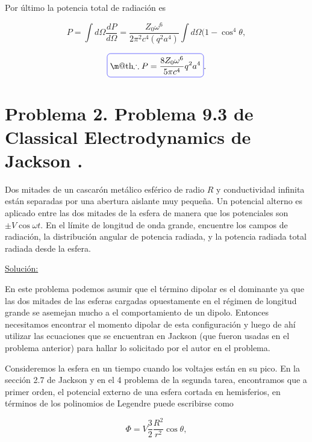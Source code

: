 \documentclass[a4paper,11pt]{article}
\makeatletter
\numberwithin{equation}{section}
\newcommand*{\boxcolor}{blue}
\renewcommand{\boxed}[1]{\textcolor{\boxcolor}{%
\tikz[baseline={([yshift=-1ex]current bounding box.center)}] \node [rectangle, minimum width=1ex,rounded corners,draw] {\normalcolor\m@th$\displaystyle#1$};}}
\makeatother
\begin{document}
Por último la potencia total de radiación es 

\begin{equation}
 P = \int d\Omega \frac{dP}{d\Omega} = \frac{Z_0\omega^6}{2\pi^2c^4(q^2a^4)} 
 \int d\Omega (1 - \cos^4{\theta},
\end{equation}

\begin{equation}
 \boxed{\therefore P = \frac{8Z_0\omega^6}{5\pi c^4}q^2a^4}.
\end{equation}

\newpage

\section{Problema 2. Problema 9.3 de Classical Electrodynamics de 
Jackson \cite{jackson}.}

Dos mitades de un cascarón metálico esférico de radio $R$ y conductividad infinita 
están separadas por una abertura aislante muy pequeña. Un potencial alterno es 
aplicado entre las dos mitades de la esfera de manera que los potenciales son 
$\pm V \cos{\omega t}$. En el límite de longitud de onda grande, encuentre los campos 
de radiación, la distribución angular de potencia radiada, y la potencia radiada 
total radiada desde la esfera. 

\vspace{.3cm}

\underline{Solución:} \vspace{.3cm}

En este problema podemos asumir que el término dipolar es el dominante ya que 
las dos mitades de las esferas cargadas opuestamente en el régimen de longitud 
grande se asemejan mucho a el comportamiento de un dipolo. Entonces necesitamos 
encontrar el momento dipolar de esta configuración y luego de ahí utilizar las 
ecuaciones que se encuentran en Jackson \cite{jackson} (que fueron usadas en el 
problema anterior) para hallar lo solicitado por el autor en el problema. 

\vspace{.3cm}

Consideremos la esfera en un tiempo cuando los voltajes están en su pico. En la 
sección 2.7 de Jackson \cite{jackson} y en el 4 problema de la segunda tarea, 
encontramos que a primer orden, el potencial externo de una esfera cortada 
en hemisferios, en términos de los polinomios de Legendre puede escribirse como 

\begin{equation}
 \Phi = V \frac{3}{2}\frac{R^2}{r^2}\cos{\theta},
\end{equation}
\end{document}
